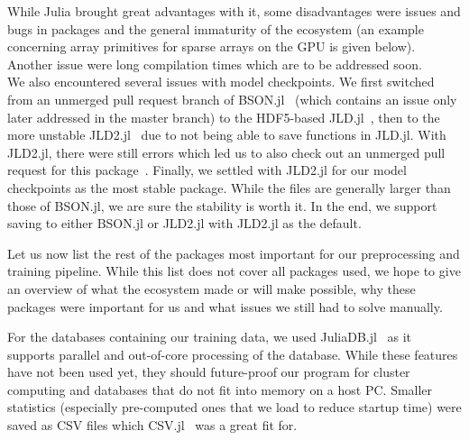While Julia brought great advantages with it, some disadvantages were
issues and bugs in packages and the general immaturity of the
ecosystem (an example concerning array primitives for sparse arrays on
the GPU is given below). Another issue were long compilation times
which are to be addressed soon. \\
We also encountered several issues with model checkpoints. We first
switched from an unmerged pull request branch of
\mbox{BSON.jl}~\cite{JuliaIOBSONJl2019,SavingArrayLength} (which
contains an issue only later addressed in the master branch) to the
HDF5-based \mbox{JLD.jl}~\cite{JuliaIOJLDJl2019}, then to the more
unstable \mbox{JLD2.jl}~\cite{JuliaIOJLD2Jl2019} due to not being able
to save functions in \mbox{JLD.jl}. With \mbox{JLD2.jl}, there were
still errors which led us to also check out an unmerged pull request
for this package~\cite{MaybeFixTypename}. Finally, we settled with
\mbox{JLD2.jl} for our model checkpoints as the most stable package.
While the files are generally larger than those of \mbox{BSON.jl}, we
are sure the stability is worth it. In the end, we support saving to
either \mbox{BSON.jl} or \mbox{JLD2.jl} with \mbox{JLD2.jl} as the
default.

Let us now list the rest of the packages most important for our
preprocessing and training pipeline. While this list does not cover
all packages used, we hope to give an overview of what the ecosystem
made or will make possible, why these packages were important for us
and what issues we still had to solve manually.

For the databases containing our training data, we used
\mbox{JuliaDB.jl}~\cite{JuliaComputingJuliaDBJl2019} as it supports
parallel and out-of-core processing of the database. While these
features have not been used yet, they should future-proof our program
for cluster computing and databases that do not fit into memory on a
host PC. Smaller statistics (especially pre-computed ones that we load
to reduce startup time) were saved as CSV files which
\mbox{CSV.jl}~\cite{JuliaDataCSVJl2019} was a great fit for.

